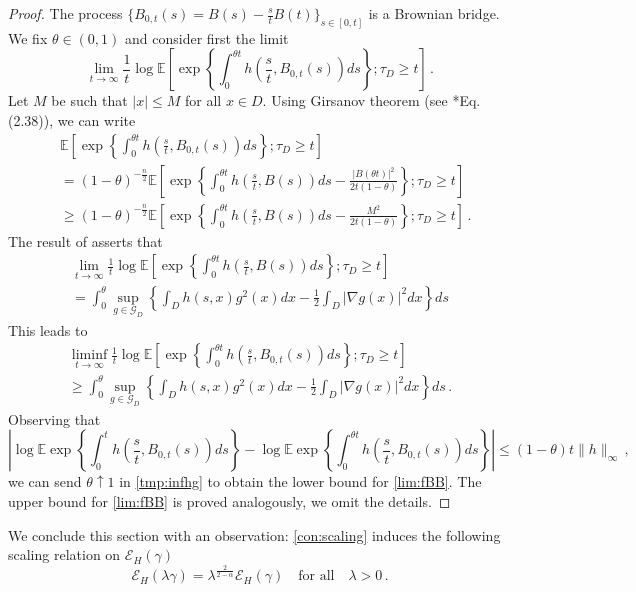 \documentclass[12pt,reqno]{amsart}
\theoremstyle{remark}
\newcommand{\1}{\mathbf{1}}
\def\EE{\mathbb{E}}
\def\cee{{\mathcal E}}
\def\cgg{{\mathcal G}}
\def\lt{\left}
\def\rt{\right}
\begin{document}
	\begin{proof}
		The process $\{B_{0,t}(s)=B(s)-\frac st B(t)\}_{s\in[0,t]}$ is a Brownian bridge.
		We fix $\theta\in(0,1)$ and consider first the limit
		\begin{equation*}
			\lim_{t\to\infty}\frac1t\log \EE \lt[\exp\left\{\int_0^{\theta t} h\left(\frac st,B_{0,t}(s)\right)ds \right\};\tau_D\ge t\rt]\,.
		\end{equation*}
		Let $M$ be such that $|x|\le M$ for all $x\in D$. Using Girsanov theorem (see \cite{HLN15}*{Eq. (2.38)}), we can write
		\begin{align*}
			&\EE \lt[\exp\left\{\int_0^{\theta t} h\left(\frac st,B_{0,t}(s)\right)ds \right\};\tau_D\ge t\rt]
			\\&=(1- \theta)^{-\frac n2}\EE \lt[\exp\left\{\int_0^{\theta t} h\left(\frac st,B(s)\right)ds-\frac{|B(\theta t)|^2}{2t(1- \theta)} \right\};\tau_D\ge t\rt]
			\\&\ge(1- \theta)^{-\frac n2}\EE \lt[\exp\left\{\int_0^{\theta t} h\left(\frac st,B(s)\right)ds-\frac{M^2}{2t(1- \theta)} \right\};\tau_D\ge t\rt]\,.
		\end{align*}
		The result of \cite[Proposition 3.1] {MR3414457} asserts that
		\begin{multline*}
			\lim_{t\to\infty}\frac1t\log \EE \lt[\exp\left\{\int_0^{\theta t} h\left(\frac st,B(s)\right)ds \right\};\tau_D\ge t\rt]
			\\=\int_0^ \theta\sup_{g\in\cgg_D}\left\{\int_{D} h(s,x) g^2(x)dx-\frac12\int_{D}|\nabla g(x)|^2dx \right\}ds
		\end{multline*}
		This leads to
		\begin{multline}\label{tmp:infhg}
			\liminf_{t\to\infty}\frac1t\log \EE \lt[\exp\left\{\int_0^{\theta t} h\left(\frac st,B_{0,t}(s)\right)ds \right\};\tau_D\ge t\rt]
			\\\ge \int_0^ \theta\sup_{g\in\cgg_D}\left\{\int_{D} h(s,x) g^2(x)dx-\frac12\int_{D}|\nabla g(x)|^2dx \right\}ds\,.
		\end{multline}
		Observing that
		\begin{equation*}
			\lt|\log\EE\exp\left\{\int_0^t h\left(\frac st,B_{0,t}(s)\right)ds \right\}-\log\EE \exp\left\{\int_0^{\theta t} h\left(\frac st,B_{0,t}(s)\right)ds \right\}\rt|\le (1- \theta)t\|h\|_\infty\,,
		\end{equation*}
		we can send $\theta\uparrow1$ in \eqref{tmp:infhg} to obtain the lower bound for \eqref{lim:fBB}.
		The upper bound for \eqref{lim:fBB} is proved analogously, we omit the details.
	\end{proof}
		We conclude this section with an observation: \ref{con:scaling} induces the following scaling relation on $\cee_H(\gamma)$
		\begin{equation}\label{scal:cee}
			\cee_H(\lambda \gamma)=\lambda^{\frac{2}{2- \alpha}}\cee_H(\gamma)\quad \mbox{for all}\quad \lambda>0\,.
		\end{equation}
\end{document}
